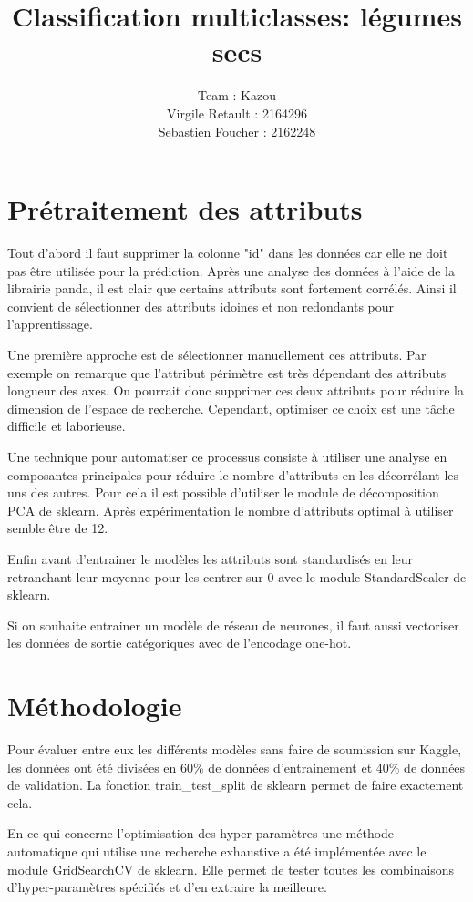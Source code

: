 \documentclass[12pt]{article}
\title{Classification multiclasses: légumes secs}
\author{
  Team : Kazou\\
  Virgile Retault : 2164296\\
  Sebastien Foucher : 2162248
}
\begin{document}
\maketitle

\section*{Prétraitement des attributs}

Tout d'abord il faut supprimer la colonne "id" dans les données car elle ne doit pas être utilisée pour la prédiction. Après une analyse des données à l'aide de la librairie panda, il est clair que certains attributs sont fortement corrélés. Ainsi il convient de sélectionner des attributs idoines et non redondants pour l'apprentissage. 

Une première approche est de sélectionner manuellement ces attributs. Par exemple on remarque que l'attribut périmètre est très dépendant des attributs longueur des axes. On pourrait donc supprimer ces deux attributs pour réduire la dimension de l'espace de recherche. Cependant, optimiser ce choix est une tâche difficile et laborieuse. 

Une technique pour automatiser ce processus consiste à utiliser une analyse en composantes principales pour réduire le nombre d'attributs en les décorrélant les uns des autres. Pour cela il est possible d'utiliser le module de décomposition PCA de sklearn. Après expérimentation le nombre d'attributs optimal à utiliser semble être de 12. 

Enfin avant d'entrainer le modèles les attributs sont standardisés en leur retranchant leur moyenne pour les centrer sur 0 avec le module StandardScaler de sklearn.

Si on souhaite entrainer un modèle de réseau de neurones, il faut aussi vectoriser les données de sortie catégoriques avec de l'encodage one-hot.

\section*{Méthodologie}

Pour évaluer entre eux les différents modèles sans faire de soumission sur Kaggle, les données ont été divisées en 60\% de données d'entrainement et 40\% de données de validation. La fonction train\_test\_split de sklearn permet de faire exactement cela.

En ce qui concerne l'optimisation des hyper-paramètres une méthode automatique qui utilise une recherche exhaustive a été implémentée avec le module GridSearchCV de sklearn. Elle permet de tester toutes les combinaisons d'hyper-paramètres spécifiés et d'en extraire la meilleure. 
\end{document}

